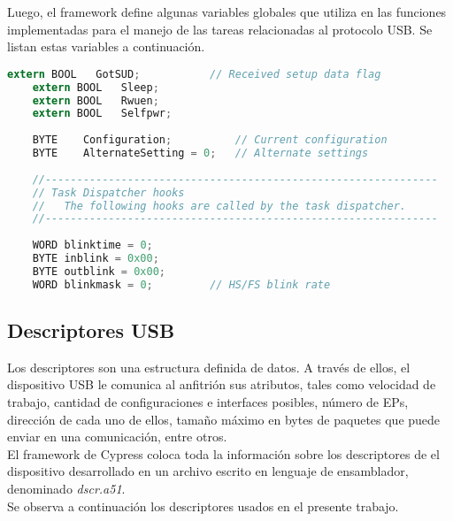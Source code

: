 	Luego, el framework define algunas variables globales que utiliza en las funciones implementadas para el manejo de las tareas relacionadas al protocolo USB. Se listan estas variables a continuación.
	
	\begin{lstlisting}[language=C,backgroundcolor=\color{gray!30}]
	extern BOOL   GotSUD;			// Received setup data flag
	extern BOOL   Sleep;
	extern BOOL   Rwuen;
	extern BOOL   Selfpwr;
	
	BYTE    Configuration;      	// Current configuration
	BYTE    AlternateSetting = 0;   // Alternate settings
	
	//--------------------------------------------------------------
	// Task Dispatcher hooks
	//   The following hooks are called by the task dispatcher.
	//--------------------------------------------------------------
	
	WORD blinktime = 0;
	BYTE inblink = 0x00;
	BYTE outblink = 0x00;
	WORD blinkmask = 0;			// HS/FS blink rate
	\end{lstlisting}
	
\subsection{Descriptores USB}	
	Los descriptores son una estructura definida de datos. A través de ellos, el dispositivo USB le comunica al anfitrión sus atributos, tales como velocidad de trabajo, cantidad de configuraciones e interfaces posibles, número de EPs, dirección de cada uno de ellos, tamaño máximo en bytes de paquetes que puede enviar en una comunicación, entre otros.\\
	
	El framework de Cypress coloca toda la información sobre los descriptores de el dispositivo desarrollado en un archivo escrito en lenguaje de ensamblador, denominado {\it dscr.a51}.\\
	
	Se observa a continuación los descriptores usados en el presente trabajo.\\%



%	
